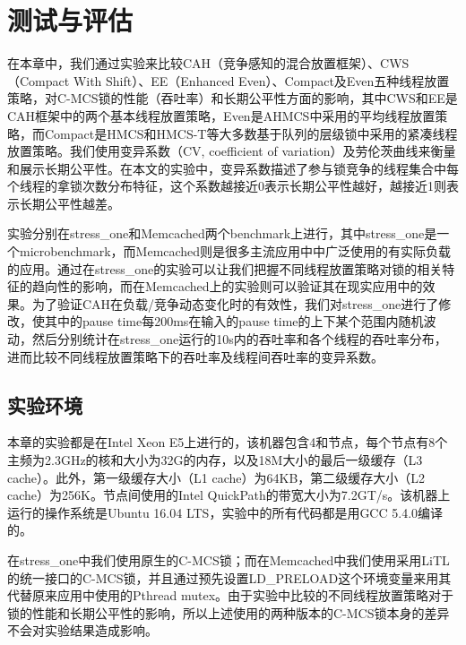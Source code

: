 
\chapter{测试与评估}
\label{chap:example}
在本章中，我们通过实验来比较CAH（竞争感知的混合放置框架）、CWS（Compact With Shift）、EE（Enhanced Even）、Compact及Even五种线程放置策略，对C-MCS锁的性能（吞吐率）和长期公平性方面的影响，其中CWS和EE是CAH框架中的两个基本线程放置策略，Even是AHMCS\cite{chabbi2016contention}中采用的平均线程放置策略，而Compact是HMCS\cite{chabbi2015high}和HMCS-T\cite{chabbi2017efficient}等大多数基于队列的层级锁中采用的紧凑线程放置策略。我们使用变异系数（CV, coefficient of variation）及劳伦茨曲线\cite{gini1912variabilita}来衡量和展示长期公平性。在本文的实验中，变异系数描述了参与锁竞争的线程集合中每个线程的拿锁次数分布特征，这个系数越接近0表示长期公平性越好，越接近1则表示长期公平性越差。

实验分别在stress\_one和Memcached两个benchmark上进行，其中stress\_one是一个microbenchmark，而Memcached则是很多主流应用中中广泛使用的有实际负载的应用。通过在stress\_one的实验可以让我们把握不同线程放置策略对锁的相关特征的趋向性的影响，而在Memcached上的实验则可以验证其在现实应用中的效果。为了验证CAH在负载/竞争动态变化时的有效性，我们对stress\_one进行了修改，使其中的pause time每200ms在输入的pause time的上下某个范围内随机波动，然后分别统计在stress\_one运行的10s内的吞吐率和各个线程的吞吐率分布，进而比较不同线程放置策略下的吞吐率及线程间吞吐率的变异系数。

\section{实验环境}
本章的实验都是在Intel Xeon E5上进行的，该机器包含4和节点，每个节点有8个主频为2.3GHz的核和大小为32G的内存，以及18M大小的最后一级缓存（L3 cache）。此外，第一级缓存大小（L1 cache）为64KB，第二级缓存大小（L2 cache）为256K。节点间使用的Intel QuickPath的带宽大小为7.2GT/s。该机器上运行的操作系统是Ubuntu 16.04 LTS，实验中的所有代码都是用GCC 5.4.0编译的。

在stress\_one中我们使用原生的C-MCS锁；而在Memcached中我们使用采用LiTL的统一接口的C-MCS锁，并且通过预先设置LD\_PRELOAD这个环境变量来用其代替原来应用中使用的Pthread mutex。由于实验中比较的不同线程放置策略对于锁的性能和长期公平性的影响，所以上述使用的两种版本的C-MCS锁本身的差异不会对实验结果造成影响。

